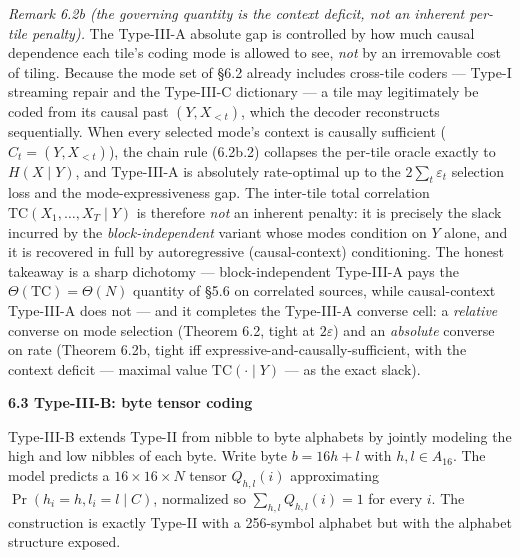 \documentclass[
]{article}
\begin{document}
\emph{Remark 6.2b (the governing quantity is the context deficit, not an
inherent per-tile penalty).} The Type-III-A absolute gap is controlled
by how much causal dependence each tile's coding mode is allowed to see,
\emph{not} by an irremovable cost of tiling. Because the mode set of
§6.2 already includes cross-tile coders --- Type-I streaming repair and
the Type-III-C dictionary --- a tile may legitimately be coded from its
causal past $(Y, X_{<t})$, which the decoder reconstructs sequentially.
When every selected mode's context is causally sufficient
($C_t = (Y, X_{<t})$), the chain rule (6.2b.2) collapses the per-tile
oracle exactly to $H(X \mid Y)$, and Type-III-A is absolutely
rate-optimal up to the $2\sum_t \varepsilon_t$ selection loss and the
mode-expressiveness gap. The inter-tile total correlation
$\mathrm{TC}(X_1,\ldots,X_T \mid Y)$ is therefore \emph{not} an inherent
penalty: it is precisely the slack incurred by the \emph{block-independent}
variant whose modes condition on $Y$ alone, and it is recovered in full
by autoregressive (causal-context) conditioning. The honest takeaway is
a sharp dichotomy --- block-independent Type-III-A pays the
$\Theta(\mathrm{TC}) = \Theta(N)$ quantity of §5.6 on correlated sources,
while causal-context Type-III-A does not --- and it completes the
Type-III-A converse cell: a \emph{relative} converse on mode selection
(Theorem 6.2, tight at $2\varepsilon$) and an \emph{absolute} converse on
rate (Theorem 6.2b, tight iff expressive-and-causally-sufficient, with
the context deficit --- maximal value $\mathrm{TC}(\cdot \mid Y)$ --- as
the exact slack).

\textbf{6.3 Type-III-B: byte tensor coding}

Type-III-B extends Type-II from nibble to byte alphabets by jointly
modeling the high and low nibbles of each byte. Write byte
$b = 16h + l$ with $h, l \in A_{16}$. The model predicts a
$16 \times 16 \times N$ tensor $Q_{h,l}(i)$ approximating
$\Pr(h_i = h, l_i = l \mid C)$, normalized so $\sum_{h,l} Q_{h,l}(i) =
1$ for every $i$. The construction is exactly Type-II with a 256-symbol
alphabet but with the alphabet structure exposed.
\end{document}
